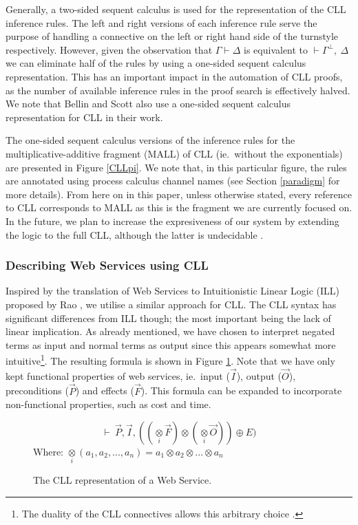 \documentclass[copyright,creativecommons]{eptcs}
\begin{document}
Generally, a two-sided sequent calculus is used for the representation of the CLL inference rules. The left and right versions of each inference rule serve the purpose of handling a connective on the left or right hand side of the turnstyle respectively. However, given the observation that $\Gamma \vdash \Delta$ is equivalent to $\vdash \Gamma^\bot,\ \Delta$ we can eliminate half of the rules by using a one-sided sequent calculus representation. This has an important impact in the automation of CLL proofs, as the number of available inference rules in the proof search is effectively halved. We note that Bellin and Scott also use a one-sided sequent calculus representation for CLL in their work.

The one-sided sequent calculus versions of the inference rules for the multiplicative-additive fragment (MALL) of CLL (ie.\ without the exponentials) are presented in Figure \ref{CLLpi}. We note that, in this particular figure, the rules are annotated using process calculus channel names (see Section \ref{paradigm} for more details). From here on in this paper, unless otherwise stated, every reference to CLL corresponds to MALL as this is the fragment we are currently focused on. In the future, we plan to increase the expresiveness of our system by extending the logic to the full CLL, although the latter is undecidable \cite{john1992decision}. 

\subsubsection{Describing Web Services using CLL}
\label{WSCLL}

Inspired by the translation of Web Services to Intuitionistic Linear Logic (ILL) proposed by Rao \cite{rao-semantic}, we utilise a similar approach for CLL. The CLL syntax has significant differences from ILL though; the most important being the lack of linear implication. As already mentioned, we have chosen to interpret negated terms as input and normal terms as output since this appears somewhat more intuitive\footnote{The duality of the CLL connectives allows this arbitrary choice \cite{bellin1994}.}. The resulting formula is shown in Figure \ref{fig:CLLSWS}. Note that we have only kept functional properties of web services, ie.\ input ($\vec{I}$), output ($\vec{O}$), preconditions ($\vec{P}$) and effects ($\vec{F}$). This formula can be expanded to incorporate non-functional properties, such as cost and time.

\begin{figure}[htbp]
	\centering
		\[ \vdash\ \vec{P}, \vec{I}, ((\underset{i}{\otimes}\vec{F})\otimes (\underset{i}{\otimes}\vec{O})) \oplus E) \]
		Where: $\underset{i}{\otimes} (a_1,a_2,..., a_n) = a_{1} \otimes a_{2} \otimes ... \otimes a_{n}$
	\caption{The CLL representation of a Web Service.}
	\label{fig:CLLSWS}
\end{figure} 
\end{document}
